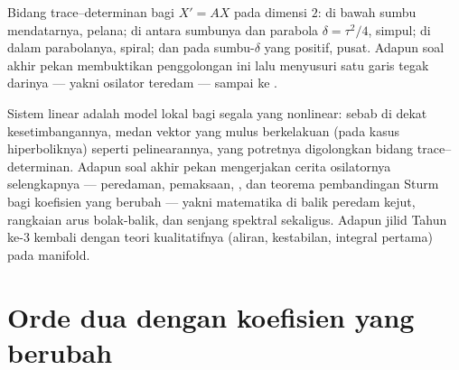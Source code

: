 \begin{omfigure}

{\small Bidang trace--determinan bagi $X' = AX$ pada dimensi
$2$: di bawah sumbu mendatarnya, pelana; di antara sumbunya dan
parabola $\delta = \tau^2/4$, simpul; di dalam parabolanya,
spiral; dan pada sumbu-$\delta$ yang positif, pusat. Adapun soal akhir
pekan membuktikan penggolongan ini lalu menyusuri satu garis tegak
darinya --- yakni osilator teredam --- sampai ke .}
\end{omfigure}

\begin{remark}
Sistem linear adalah model lokal bagi segala yang nonlinear:
sebab di dekat kesetimbangannya, medan vektor yang mulus berkelakuan (pada
kasus hiperboliknya) seperti pelinearannya, yang potretnya digolongkan
bidang trace--determinan. Adapun soal akhir pekan mengerjakan
cerita osilatornya selengkapnya --- peredaman, pemaksaan,
, dan teorema pembandingan Sturm bagi koefisien
yang berubah --- yakni matematika di balik peredam kejut, rangkaian
arus bolak-balik, dan senjang spektral sekaligus. Adapun jilid Tahun ke-3 kembali
dengan teori kualitatifnya (aliran, kestabilan, integral
pertama) pada manifold.
\end{remark}

\section{Orde dua dengan koefisien yang berubah}

